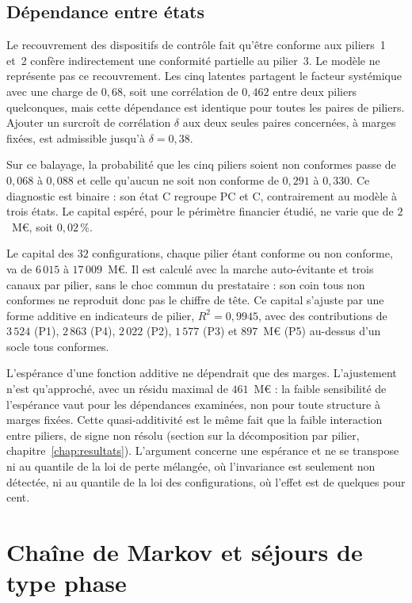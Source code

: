 \subsection{Dépendance entre états}
\label{sec:dependance-etats}


Le recouvrement des dispositifs de contrôle fait qu'être conforme aux piliers~1 et~2 confère
indirectement une conformité partielle au pilier~3. Le modèle ne représente pas ce recouvrement. Les
cinq latentes partagent le facteur systémique avec une charge de $0{,}68$, soit une corrélation de
$0{,}462$ entre deux piliers quelconques, mais cette dépendance est identique pour toutes les paires de piliers. Ajouter un surcroît
de corrélation $\delta$ aux deux seules paires concernées, à marges fixées, est admissible jusqu'à
$\delta = 0{,}38$.

Sur ce balayage, la probabilité que les cinq piliers soient non conformes passe
de $0{,}068$ à $0{,}088$ et celle qu'aucun ne soit non conforme de $0{,}291$ à $0{,}330$. Ce diagnostic est binaire : son état C regroupe PC et C, contrairement au modèle à trois états. Le capital
espéré, pour le périmètre financier étudié, ne varie que de $2$~M\euro, soit $0{,}02\,\%$.

Le capital des $32$ configurations, chaque pilier étant conforme ou non conforme, va de $6\,015$ à $17\,009$~M\euro.
Il est calculé avec la marche auto-évitante et trois canaux par pilier, sans le choc commun du
prestataire : son coin tous non conformes ne reproduit donc pas le chiffre de tête. Ce capital s'ajuste par une forme additive en
indicateurs de pilier, $R^2 = 0{,}9945$, avec des contributions de $3\,524$ (P1), $2\,863$ (P4),
$2\,022$ (P2), $1\,577$ (P3) et $897$~M\euro{} (P5) au-dessus d'un socle tous conformes.

L'espérance d'une fonction additive ne dépendrait que des marges. L'ajustement n'est
qu'approché, avec un résidu maximal de $461$~M\euro{} : la faible sensibilité de l'espérance vaut
pour les dépendances examinées, non pour toute structure à marges fixées. Cette quasi-additivité est le même fait que la faible
interaction entre piliers, de signe non résolu (section sur la décomposition par pilier,
chapitre~\ref{chap:resultats}). L'argument concerne une
espérance et ne se transpose ni au quantile de la loi de perte mélangée, où l'invariance est
seulement non détectée, ni au quantile de la loi des configurations, où l'effet est de quelques pour
cent.

\section{Chaîne de Markov et séjours de type phase}

